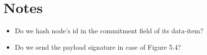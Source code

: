 \chapter{Notes}

\begin{itemize}
	\item Do we hash node's id in the commitment field of its data-item?
	\item Do we send the payload signature in case of Figure 5.4?
\end{itemize}